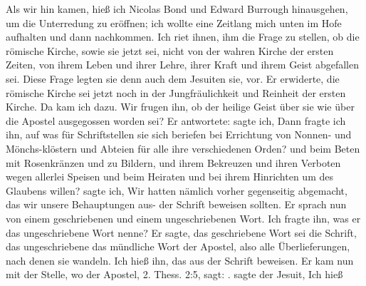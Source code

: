 Als wir hin kamen, hieß ich Nicolas Bond 
und Edward Burrough
hinausgehen, um die Unterredung zu eröffnen; ich wollte eine
Zeitlang mich unten im Hofe aufhalten und dann nachkommen.
Ich riet ihnen, ihm die Frage zu stellen, ob die römische Kirche,
sowie sie jetzt sei, nicht von der wahren Kirche der ersten Zeiten,
von ihrem Leben und ihrer Lehre, ihrer Kraft und ihrem Geist
abgefallen sei. Diese Frage legten sie denn auch dem Jesuiten sie,
vor. Er erwiderte, die römische Kirche sei jetzt noch in der 
Jungfräulichkeit und Reinheit der ersten Kirche. Da kam ich dazu.
Wir frugen ihn, ob der heilige Geist über sie wie über die Apostel
ausgegossen worden sei? Er antwortete:   sagte
ich,  Dann fragte ich ihn, auf was
für Schriftstellen sie sich beriefen bei Errichtung von Nonnen- und
Mönchs-klöstern und Abteien für alle ihre verschiedenen Orden?
und beim Beten mit Rosenkränzen und zu Bildern, und ihrem
Bekreuzen und ihren Verboten wegen allerlei Speisen und beim
Heiraten und bei ihrem Hinrichten um des Glaubens willen?
 sagte ich,  Wir hatten nämlich
vorher gegenseitig abgemacht, das wir unsere Behauptungen aus-
der Schrift beweisen sollten. Er sprach nun 
von einem geschriebenen und einem ungeschriebenen Wort. Ich 
fragte ihn, was er
das ungeschriebene Wort nenne? Er sagte, das geschriebene
Wort sei die Schrift, das ungeschriebene das mündliche Wort der
Apostel, also alle Überlieferungen, nach denen sie wandeln. 
 Ich
hieß ihn, das aus der Schrift beweisen. Er kam nun mit der
Stelle, wo der Apostel, 2. Thess. 2:5,
 sagt: .
 sagte der Jesuit,  Ich hieß
